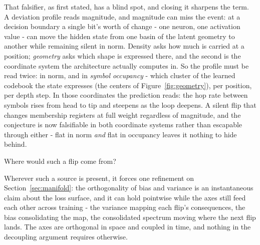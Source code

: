 That falsifier, as first stated, has a blind spot, and closing it sharpens the term. A deviation profile reads magnitude, and magnitude can miss the event: at a decision boundary a single bit's worth of change - one neuron, one activation value - can move the hidden state from one basin of the latent geometry to another while remaining silent in norm. Density asks how much is carried at a position; \textit{geometry} asks which shape is expressed there, and the second is the coordinate system the architecture actually computes in. So the profile must be read twice: in norm, and in \textit{symbol occupancy} - which cluster of the learned codebook the state expresses (the centers of Figure~\ref{fig:geometry}), per position, per depth step. In those coordinates the prediction reads: the hop rate between symbols rises from head to tip and steepens as the loop deepens. A silent flip that changes membership registers at full weight regardless of magnitude, and the conjecture is now falsifiable in both coordinate systems rather than escapable through either - flat in norm \textit{and} flat in occupancy leaves it nothing to hide behind.

Where would such a flip come from?

\paperFramingFlip

Wherever such a source is present, it forces one refinement on Section~\ref{sec:manifold}: the orthogonality of bias and variance is an instantaneous claim about the loss surface, and it can hold pointwise while the axes still feed each other across training - the variance mapping each flip's consequences, the bias consolidating the map, the consolidated spectrum moving where the next flip lands. The axes are orthogonal in space and coupled in time, and nothing in the decoupling argument requires otherwise.

